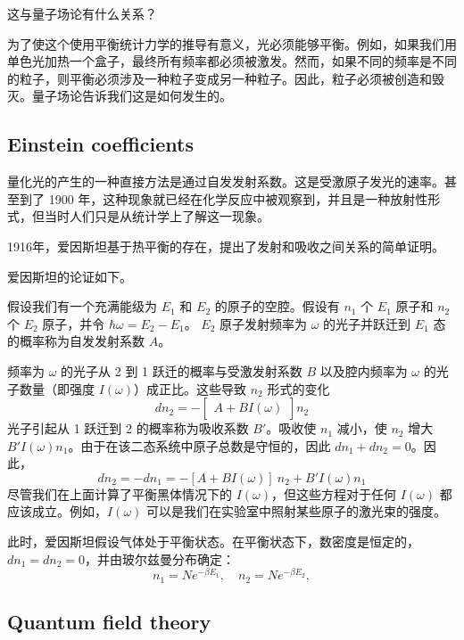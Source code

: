\documentclass[14pt,a4paper,oneside]{article}
\numberwithin{equation}{section}             %
\numberwithin{figure}{section}               %
\begin{document}
这与量子场论有什么关系？

为了使这个使用平衡统计力学的推导有意义，光必须能够平衡。例如，如果我们用单色光加热一个盒子，最终所有频率都必须被激发。然而，如果不同的频率是不同的粒子，则平衡必须涉及一种粒子变成另一种粒子。因此，粒子必须被创造和毁灭。量子场论告诉我们这是如何发生的。

\subsection{Einstein coefficients}

量化光的产生的一种直接方法是通过自发发射系数。这是受激原子发光的速率。甚至到了 1900 年，这种现象就已经在化学反应中被观察到，并且是一种放射性形式，但当时人们只是从统计学上了解这一现象。 

1916年，爱因斯坦基于热平衡的存在，提出了发射和吸收之间关系的简单证明。

爱因斯坦的论证如下。

假设我们有一个充满能级为 $E_1$ 和 $E_2$ 的原子的空腔。假设有 $n_1$ 个 $E_1$ 原子和 $n_2$ 个 $E_2$ 原子，并令 $\hbar \omega = E_2 - E_1$。 $E_2$ 原子发射频率为 $\omega$ 的光子并跃迁到 $E_1$ 态的概率称为自发发射系数 $A$。

频率为 $\omega $ 的光子从 2 到 1 跃迁的概率与受激发射系数 $B$ 以及腔内频率为 $\omega$ 的光子数量（即强度 $I(\omega)$）成正比。这些导致 $n_2$ 形式的变化
\begin{equation}
    dn_2=-\begin{bmatrix}A+BI(\omega)\end{bmatrix}n_2
    \label{eq:1.8}
\end{equation}
光子引起从 1 跃迁到 2 的概率称为吸收系数 $B'$。吸收使 $n_1$ 减小，使 $n_2$ 增大 $B′I(\omega)n_1$。由于在该二态系统中原子总数是守恒的，因此 $dn_1 + dn_2 = 0$。因此，
\begin{equation}
    dn_2=-dn_1=-[A+BI(\omega)]\:n_2+B'I(\omega)n_1
    \label{eq:1.9}
\end{equation}
尽管我们在上面计算了平衡黑体情况下的 $I(\omega )$，但这些方程对于任何 $I(\omega )$ 都应该成立。例如，$I(\omega )$ 可以是我们在实验室中照射某些原子的激光束的强度。

此时，爱因斯坦假设气体处于平衡状态。在平衡状态下，数密度是恒定的，$dn_1 = dn_2 = 0$，并由玻尔兹曼分布确定：
\begin{equation}
    n_1=Ne^{-\beta E_1},\quad n_2=Ne^{-\beta E_2},
    \label{eq:1.10}
\end{equation}



\subsection{Quantum field theory}
\end{document}
